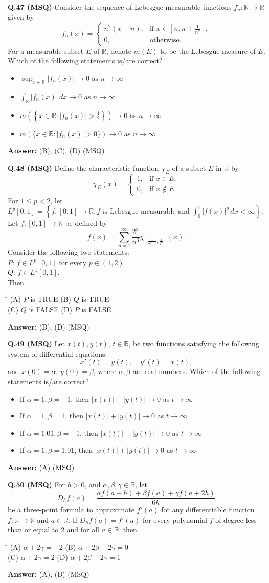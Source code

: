\documentclass[11pt,a4paper]{article}
\newcommand{\optsfourA}[4]{%
  \begin{tabbing}
    \hspace{0.48\linewidth}\=\kill
    (A) #1 \> (B) #2 \\[2pt]
    (C) #3 \> (D) #4
  \end{tabbing}%
}
\newcommand{\optslistA}[4]{%
  \begin{itemize}
    \setlength{\itemsep}{2pt}\setlength{\parskip}{0pt}
    \item[(A)] #1
    \item[(B)] #2
    \item[(C)] #3
    \item[(D)] #4
  \end{itemize}%
}
\newcommand{\ans}[1]{\textbf{Answer:} #1\par\medskip}
\begin{document}
\textbf{Q.47 (MSQ)} Consider the sequence of Lebesgue measurable functions $f_n : \mathbb{R} \to \mathbb{R}$ given by
\[
  f_n(x) = \begin{cases} n^2(x - n), & \text{if } x \in \left[n, n + \frac{1}{n^2}\right], \\ 0, & \text{otherwise.} \end{cases}
\]
For a measurable subset $E$ of $\mathbb{R}$, denote $m(E)$ to be the Lebesgue measure of $E$. Which of the following statements is/are correct?
\optslistA{$\sup_{x \in \mathbb{R}} |f_n(x)| \to 0$ as $n \to \infty$}{$\int_{\mathbb{R}} |f_n(x)|\,dx \to 0$ as $n \to \infty$}{$m\!\left(\left\{x \in \mathbb{R} : |f_n(x)| > \frac{1}{2}\right\}\right) \to 0$ as $n \to \infty$}{$m(\{x \in \mathbb{R} : |f_n(x)| > 0\}) \to 0$ as $n \to \infty$}
\ans{(B), (C), (D) (MSQ)}

\textbf{Q.48 (MSQ)} Define the characteristic function $\chi_E$ of a subset $E$ in $\mathbb{R}$ by
\[
  \chi_E(x) = \begin{cases} 1, & \text{if } x \in E, \\ 0, & \text{if } x \notin E. \end{cases}
\]
For $1 \le p < 2$, let $L^p[0, 1] = \left\{f : [0, 1] \to \mathbb{R} : f \text{ is Lebesgue measurable and } \int_0^1 |f(x)|^p\,dx < \infty\right\}$. Let $f : [0, 1] \to \mathbb{R}$ be defined by
\[
  f(x) = \sum_{n=1}^{\infty} \frac{2^n}{n^3} \chi_{\left[\frac{1}{2^{n+1}}, \frac{1}{2^n}\right]}(x).
\]
Consider the following two statements:\\
$P$: $f \in L^p[0, 1]$ for every $p \in (1, 2)$.\\
$Q$: $f \in L^1[0, 1]$.\\
Then
\optsfourA{$P$ is TRUE}{$Q$ is TRUE}{$Q$ is FALSE}{$P$ is FALSE}
\ans{(B), (D) (MSQ)}

\textbf{Q.49 (MSQ)} Let $x(t), y(t)$, $t \in \mathbb{R}$, be two functions satisfying the following system of differential equations:
\[
  x'(t) = y(t), \quad y'(t) = x(t),
\]
and $x(0) = \alpha$, $y(0) = \beta$, where $\alpha, \beta$ are real numbers. Which of the following statements is/are correct?
\optslistA{If $\alpha = 1, \beta = -1$, then $|x(t)| + |y(t)| \to 0$ as $t \to \infty$}{If $\alpha = 1, \beta = 1$, then $|x(t)| + |y(t)| \to 0$ as $t \to \infty$}{If $\alpha = 1.01, \beta = -1$, then $|x(t)| + |y(t)| \to 0$ as $t \to \infty$}{If $\alpha = 1, \beta = 1.01$, then $|x(t)| + |y(t)| \to 0$ as $t \to \infty$}
\ans{(A) (MSQ)}

\textbf{Q.50 (MSQ)} For $h > 0$, and $\alpha, \beta, \gamma \in \mathbb{R}$, let
\[
  D_h f(a) = \frac{\alpha f(a - h) + \beta f(a) + \gamma f(a + 2h)}{6h}
\]
be a three-point formula to approximate $f'(a)$ for any differentiable function $f : \mathbb{R} \to \mathbb{R}$ and $a \in \mathbb{R}$. If $D_h f(a) = f'(a)$ for every polynomial $f$ of degree less than or equal to $2$ and for all $a \in \mathbb{R}$, then
\optsfourA{$\alpha + 2\gamma = -2$}{$\alpha + 2\beta - 2\gamma = 0$}{$\alpha + 2\gamma = 2$}{$\alpha + 2\beta - 2\gamma = 1$}
\ans{(A), (B) (MSQ)}
\end{document}
